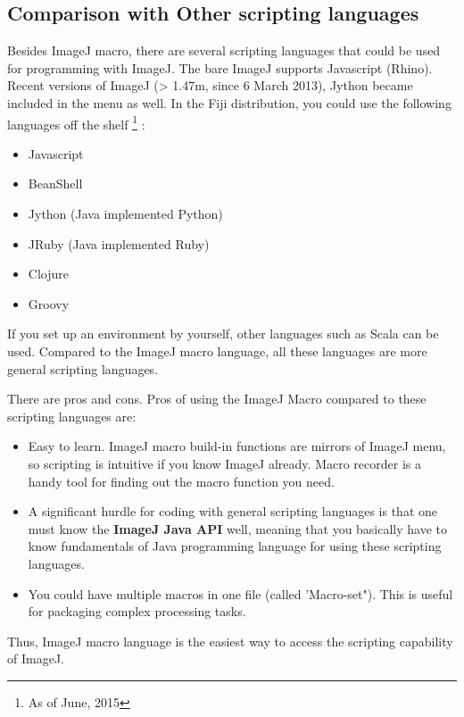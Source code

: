 \documentclass[11pt,a4paper,oneside]{report}
\begin{document}
\subsection{Comparison with Other scripting languages}

Besides ImageJ macro, there are several scripting languages that
could be used for programming with ImageJ. The bare ImageJ supports Javascript (Rhino). Recent versions of ImageJ (> 1.47m,  since 6 March 2013), Jython became included in the menu as well. 
In the Fiji distribution, you could use the following languages off the shelf
\footnote{As of June, 2015}
:

\begin{itemize}
 \item Javascript
 \item BeanShell
 \item Jython (Java implemented Python)
 \item JRuby (Java implemented Ruby)
 \item Clojure
 \item Groovy
 \end{itemize}

If you set up an environment by yourself, other languages such as Scala can be used. 
Compared to the ImageJ macro language, all these languages are more general scripting languages. 

There are pros and cons. Pros of using the ImageJ Macro compared to these scripting languages are: 
\begin{itemize}
\item Easy to learn. 
ImageJ macro build-in functions are mirrors of ImageJ menu, so scripting is intuitive if you know ImageJ already. 
Macro recorder is a handy tool for finding out the macro function you need. 

\item A significant hurdle for coding with general scripting languages is that one must know the 
\textbf{ImageJ Java API} well, meaning that you basically have to know 
fundamentals of Java programming language for using these scripting languages. 

\item You could have multiple macros in one file (called 'Macro-set"). 
This is useful for packaging complex processing tasks.

\end{itemize}

Thus, ImageJ macro language is the easiest way to access the scripting
capability of ImageJ.
\end{document}
